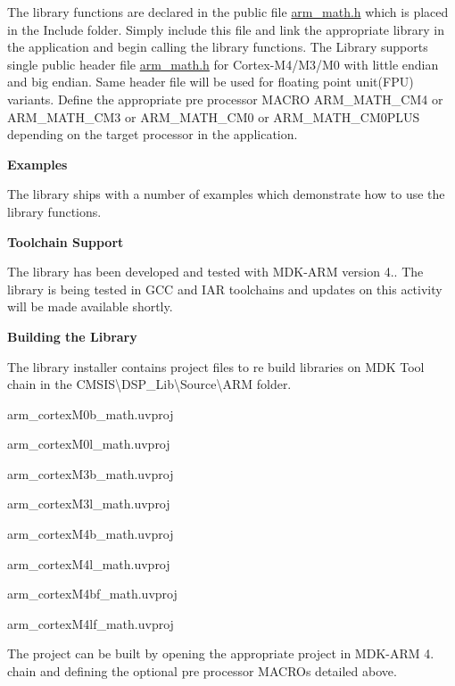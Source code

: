 The library functions are declared in the public file {\ttfamily \hyperlink{arm__math_8h}{arm\+\_\+math.\+h}} which is placed in the {\ttfamily Include} folder. Simply include this file and link the appropriate library in the application and begin calling the library functions. The Library supports single public header file {\ttfamily  \hyperlink{arm__math_8h}{arm\+\_\+math.\+h}} for Cortex-\/\+M4/\+M3/\+M0 with little endian and big endian. Same header file will be used for floating point unit(\+F\+P\+U) variants. Define the appropriate pre processor M\+A\+C\+RO A\+R\+M\+\_\+\+M\+A\+T\+H\+\_\+\+C\+M4 or A\+R\+M\+\_\+\+M\+A\+T\+H\+\_\+\+C\+M3 or A\+R\+M\+\_\+\+M\+A\+T\+H\+\_\+\+C\+M0 or A\+R\+M\+\_\+\+M\+A\+T\+H\+\_\+\+C\+M0\+P\+L\+US depending on the target processor in the application.

{\bfseries Examples}

The library ships with a number of examples which demonstrate how to use the library functions.

{\bfseries Toolchain Support}

The library has been developed and tested with M\+D\+K-\/\+A\+RM version 4.. The library is being tested in G\+CC and I\+AR toolchains and updates on this activity will be made available shortly.

{\bfseries Building the Library}

The library installer contains project files to re build libraries on M\+DK Tool chain in the {\ttfamily C\+M\+S\+IS\textbackslash{}D\+S\+P\+\_\+\+Lib\textbackslash{}Source\textbackslash{}A\+RM} folder.
\begin{DoxyItemize}
\item arm\+\_\+cortex\+M0b\+\_\+math.\+uvproj
\item arm\+\_\+cortex\+M0l\+\_\+math.\+uvproj
\item arm\+\_\+cortex\+M3b\+\_\+math.\+uvproj
\item arm\+\_\+cortex\+M3l\+\_\+math.\+uvproj
\item arm\+\_\+cortex\+M4b\+\_\+math.\+uvproj
\item arm\+\_\+cortex\+M4l\+\_\+math.\+uvproj
\item arm\+\_\+cortex\+M4bf\+\_\+math.\+uvproj
\item arm\+\_\+cortex\+M4lf\+\_\+math.\+uvproj
\end{DoxyItemize}

The project can be built by opening the appropriate project in M\+D\+K-\/\+A\+RM 4. chain and defining the optional pre processor M\+A\+C\+R\+Os detailed above.

